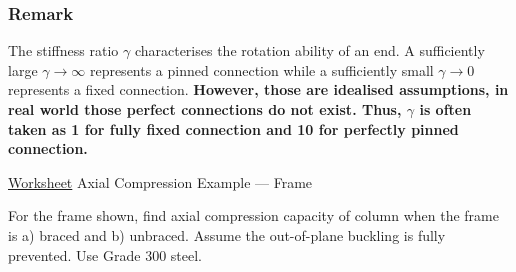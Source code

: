 \subsubsection{Remark}
The stiffness ratio $\gamma$ characterises the rotation ability of an end. A sufficiently large $\gamma\rightarrow\infty$ represents a pinned connection while a sufficiently small $\gamma\rightarrow0$ represents a fixed connection. \textbf{However, those are idealised assumptions, in real world those perfect connections do not exist. Thus, $\gamma$ is often taken as \num{1} for fully fixed connection and \num{10} for perfectly pinned connection.}

\begin{exmp}\href{run:./WORKSHEET/CH04/EX4.ACFM.sm}{Worksheet}
Axial Compression Example --- Frame

For the frame shown, find axial compression capacity of column when the frame is a) braced and b) unbraced. Assume the out-of-plane buckling is fully prevented. Use Grade 300 steel.
\begin{figure}[H]

\end{figure}
\end{exmp}
